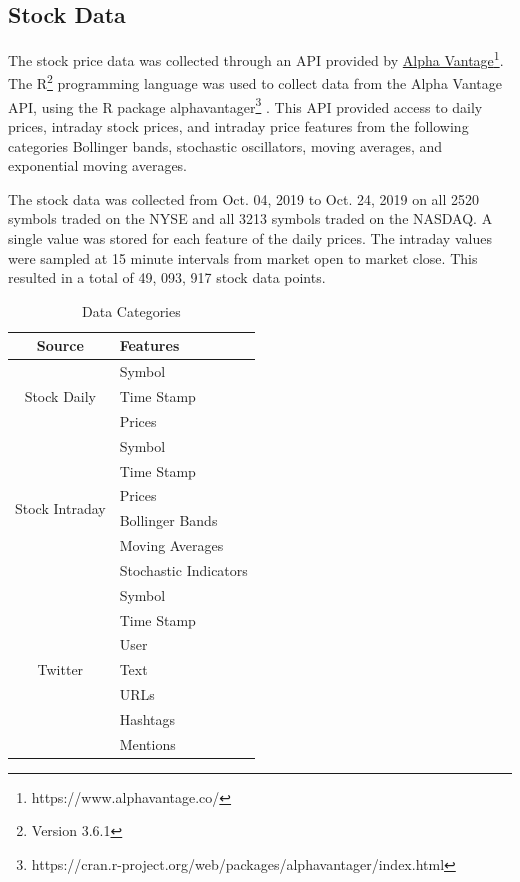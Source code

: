 \documentclass[journal]{IEEEtran}
\begin{document}
\subsection{Stock Data}

The stock price data was collected through an API provided by
 \href{https://www.alphavantage.co/}{Alpha Vantage}\footnote{https://www.alphavantage.co/}.
The R\footnote{Version 3.6.1}
 programming language was used to collect data from the Alpha Vantage API,
 using the R package alphavantager\footnote{https://cran.r-project.org/web/packages/alphavantager/index.html}
\cite{R}.
This API provided access to daily prices, intraday stock prices,
 and intraday price features from the following categories Bollinger bands, 
 stochastic oscillators, moving averages, and exponential moving averages. 

The stock data was collected from Oct. 04, 2019 to Oct. 24, 2019 on
 all 2520 symbols traded on the NYSE and all 3213 symbols traded on the NASDAQ.
A single value was stored for each feature of the daily prices.
The intraday values were sampled at 15 minute intervals from market open
 to market close.
This resulted in a total of 49, 093, 917 stock data points.

\begin{table}
	\renewcommand{\arraystretch}{1.3}
	\caption{Data Categories}
	\label{DataCategories}
	\centering
	\begin{tabular}{c l}
		\hline
		\hline
		\textbf{Source}       & \textbf{Features}\\
		\hline
		\multirow{3}{*}{Stock Daily} &  Symbol \\
		&  Time Stamp \\
		&  Prices \\
		\hline
		\multirow{6}{*}{Stock Intraday} &  Symbol \\
		&  Time Stamp \\
		&  Prices \\
		&  Bollinger Bands \\
		&  Moving Averages \\
		&  Stochastic Indicators \\
		\hline
		\multirow{7}{*}{Twitter} &  Symbol \\
		&  Time Stamp \\
		&  User \\
		&  Text \\
		&  URLs \\
		&  Hashtags \\
		&  Mentions \\
		\hline
		\hline
	\end{tabular}
\end{table}
\end{document}
